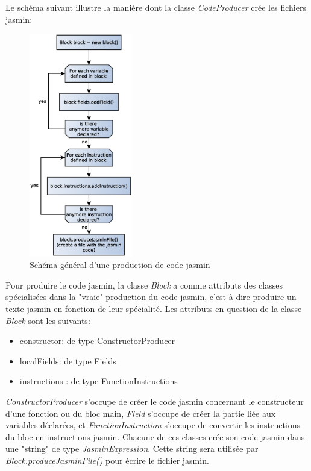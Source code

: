 \documentclass[11pt,a4paper]{article}
\begin{document}
  \par Le schéma suivant illustre la manière dont la classe \textit{CodeProducer} crée les fichiers jasmin: 
  
  \newpage
    \begin{figure}[h]
    \includegraphics[width=0.4\textwidth,center]{../ressources/jasminFileProducionOverview.eps}
    \caption{Schéma général d'une production de code jasmin}
  \end{figure}
  
  \par Pour produire le code jasmin, la classe \textit{Block} a comme attributs des classes spécialisées dans la "vraie" production du code jasmin, c'est à dire produire un  texte jasmin en fonction de leur spécialité. Les attributs en question de la classe \textit{Block} sont les suivants: 
  
  \begin{itemize}
    \item constructor: de type ConstructorProducer
    \item localFields: de type Fields
    \item instructions : de type FunctionInstructions
  \end{itemize}
  
  \par \textit{ConstructorProducer} s'occupe de créer le code jasmin concernant le constructeur d'une fonction ou du bloc main, \textit{Field} s'occupe de créer la partie liée aux variables déclarées, et \textit{FunctionInstruction} s'occupe de convertir les instructions du bloc en instructions jasmin. Chacune de ces classes crée son code jasmin dans une "string" de type \textit{JasminExpression}. Cette string sera utilisée par \textit{Block.produceJasminFile()} pour écrire le fichier jasmin. 
  
\end{document}
